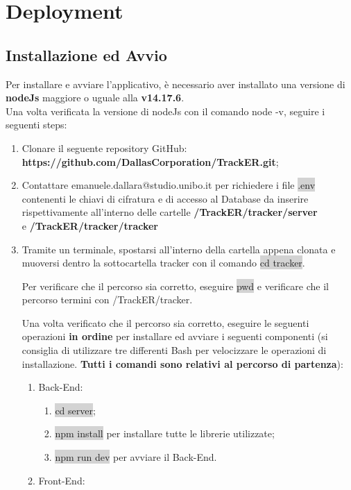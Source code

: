 \documentclass{report}
\begin{document}
\chapter{Deployment}
\section{Installazione ed Avvio}
Per installare e avviare l'applicativo, è necessario aver installato una versione di \textbf{nodeJs} maggiore o uguale alla \textbf{v14.17.6}.
\\Una volta verificata la versione di nodeJs con il comando node -v, seguire i seguenti steps:
\begin{enumerate} 
\item Clonare il seguente repository GitHub: \\ \textbf{ https://github.com/DallasCorporation/TrackER.git};
\item Contattare emanuele.dallara@studio.unibo.it per richiedere i file  \colorbox{lightgray}{.env} contenenti le chiavi di cifratura e di accesso al Database da inserire rispettivamente all'interno delle cartelle \textbf{/TrackER/tracker/server} \\e \textbf{/TrackER/tracker/tracker}
\item Tramite un terminale, spostarsi all'interno della cartella appena clonata e muoversi dentro la sottocartella tracker con il comando \colorbox{lightgray}{cd tracker}.
\par Per verificare che il percorso sia corretto, eseguire \colorbox{lightgray}{pwd} e verificare che il percorso termini con /TrackER/tracker.
\par Una volta verificato che il percorso sia corretto, eseguire le seguenti operazioni \textbf{in ordine} per installare ed avviare i seguenti componenti (si consiglia di utilizzare tre differenti Bash per velocizzare le operazioni di installazione. \textbf{Tutti i comandi sono relativi al percorso di partenza}):
\begin{enumerate}
\item Back-End: 
\begin{enumerate}
\item  \colorbox{lightgray}{cd server};
\item \colorbox{lightgray}{npm install} per installare tutte le librerie utilizzate;
\item \colorbox{lightgray}{npm run dev} per avviare il Back-End.
\end{enumerate}
\item Front-End:

\end{enumerate}
\end{enumerate}
\end{document}
